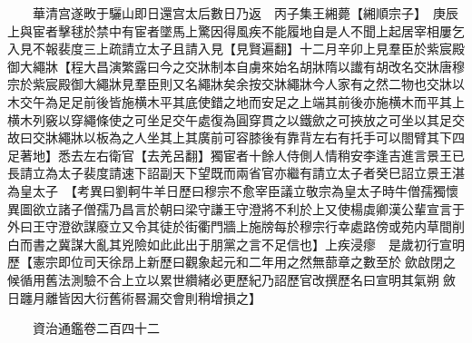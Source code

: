 　　華清宫遂畋于驪山即日還宫太后數日乃返　丙子集王緗薨【緗順宗子】　庚辰上與宦者擊毬於禁中有宦者墜馬上驚因得風疾不能履地自是人不聞上起居宰相屢乞入見不報裴度三上疏請立太子且請入見【見賢遍翻】十二月辛卯上見羣臣於紫宸殿御大繩牀【程大昌演繁露曰今之交牀制本自虜來始名胡牀隋以䜟有胡改名交牀唐穆宗於紫宸殿御大繩牀見羣臣則又名繩牀矣余按交牀繩牀今人家有之然二物也交牀以木交午為足足前後皆施横木平其底使錯之地而安足之上端其前後亦施横木而平其上横木列竅以穿繩條使之可坐足交午處復為圓穿貫之以鐵歛之可挾放之可坐以其足交故曰交牀繩牀以板為之人坐其上其廣前可容膝後有靠背左右有托手可以閤臂其下四足著地】悉去左右衛官【去羌呂翻】獨宦者十餘人侍側人情稍安李逢吉進言景王已長請立為太子裴度請速下詔副天下望既而兩省官亦繼有請立太子者癸巳詔立景王湛為皇太子　【考異曰劉軻牛羊日歷曰穆宗不愈宰臣議立敬宗為皇太子時牛僧孺獨懷異圖欲立諸子僧孺乃昌言於朝曰梁守謙王守澄將不利於上又使楊虡卿漢公輩宣言于外曰王守澄欲謀廢立又令其徒於街衢門牆上施牓每於穆宗行幸處路傍或苑内草間削白而書之冀謀大亂其兇險如此此出于朋黨之言不足信也】上疾浸瘳　是歲初行宣明歷【憲宗即位司天徐昂上新歷曰觀象起元和二年用之然無蔀章之數至於歛啟閉之候循用舊法測驗不合上立以累世纘緒必更歷紀乃詔歷官改撰歷名曰宣明其氣朔斂日躔月離皆因大衍舊術晷漏交會則稍增損之】

　　資治通鑑卷二百四十二


    


 


 



 

 
  







 


　　
　　
　
　
　


　　

　















	
	









































